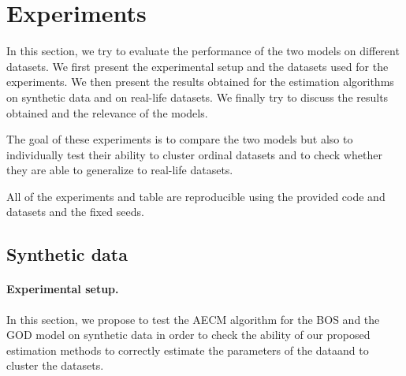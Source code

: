 \section{Experiments}
In this section, we try to evaluate the performance of the two models on different datasets. We first present the experimental setup and the datasets used for the experiments. We then present the results obtained for the estimation algorithms on synthetic data and on real-life datasets. We finally try to discuss the results obtained and the relevance of the models. 

The goal of these experiments is to compare the two models but also to individually test their ability to cluster ordinal datasets and to check whether they are able to generalize to real-life datasets.

All of the experiments and table are reproducible using the provided code and datasets and the fixed seeds.

\subsection{Synthetic data}
\paragraph{Experimental setup.}
In this section, we propose to test the AECM algorithm for the BOS and the GOD model on synthetic data in order to check the ability of our proposed estimation methods to correctly estimate the parameters of the dataand to cluster the datasets. 

